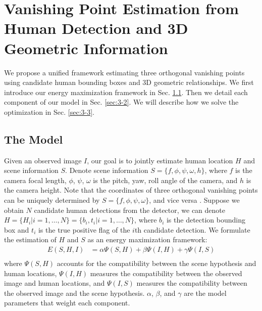\section{Vanishing Point Estimation from Human Detection and 3D Geometric Information}
\label{sec:3}

We propose a unified framework estimating three orthogonal vanishing points using candidate human bounding boxes and 3D geometric relationships. We first introduce our energy maximization framework in Sec. \ref{sec:3-1}. Then we detail each component of our model in Sec. \ref{sec:3-2}. We will describe how we solve the optimization in Sec. \ref{sec:3-3}.

\subsection{The Model}
\label{sec:3-1}
Given an observed image $I$, our goal is to jointly estimate human location $H$ and scene information $S$. Denote scene information $S = \{f,\phi,\psi,\omega,h\}$, where $f$ is the camera focal length, $\phi$, $\psi$, $\omega$ is the pitch, yaw, roll angle of the camera, and $h$ is the camera height. Note that the coordinates of three orthogonal vanishing points can be uniquely determined by $S = \{f,\phi,\psi,\omega\}$, and vice versa \cite{Hartley2004}. Suppose we obtain $N$ candidate human detections from the detector, we can denote  $H = \{H_i | i = 1,\dots,N\} = \{b_i, t_i | i = 1,\dots,N\}$, where $b_i$ is the detection bounding box and $t_i$ is the true positive flag of the $i$th candidate detection. We formulate the estimation of $H$ and $S$ as an energy maximization framework:
\begin{equation}
\begin{split}
  E(S,H,I) & = \alpha\Psi(S,H) + \beta\Psi(I,H) +\gamma\Psi(I,S) \\
\end{split}
\end{equation}
where $\Psi(S,H)$ accounts for the compatibility between the scene hypothesis and human locations, $\Psi(I,H)$ measures the compatibility between the observed image and human locations, and $\Psi(I,S)$ measures the compatibility between the observed image and the scene hypothesis. $\alpha$, $\beta$, and $\gamma$ are the model parameters that weight each component.

